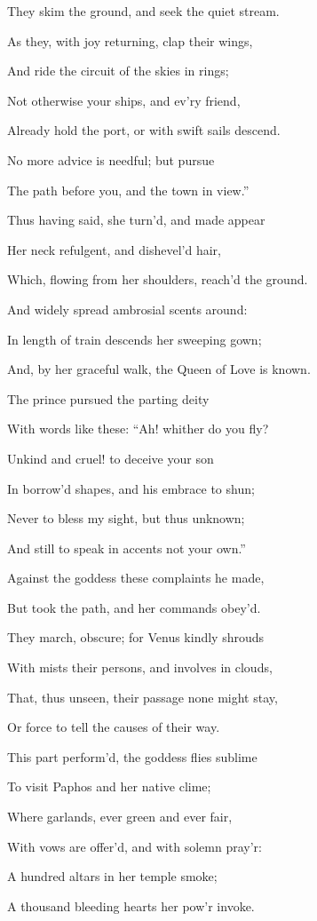 They skim the ground, and seek the quiet stream.

As they, with joy returning, clap their wings,

And ride the circuit of the skies in rings;

Not otherwise your ships, and ev’ry friend,

Already hold the port, or with swift sails descend.

No more advice is needful; but pursue

The path before you, and the town in view.”

Thus having said, she turn’d, and made appear

Her neck refulgent, and dishevel’d hair,

Which, flowing from her shoulders, reach’d the ground.

And widely spread ambrosial scents around:

In length of train descends her sweeping gown;

And, by her graceful walk, the Queen of Love is known.

The prince pursued the parting deity

With words like these: “Ah! whither do you fly?

Unkind and cruel! to deceive your son

In borrow’d shapes, and his embrace to shun;

Never to bless my sight, but thus unknown;

And still to speak in accents not your own.”

Against the goddess these complaints he made,

But took the path, and her commands obey’d.

They march, obscure; for Venus kindly shrouds

With mists their persons, and involves in clouds,

That, thus unseen, their passage none might stay,

Or force to tell the causes of their way.

This part perform’d, the goddess flies sublime

To visit Paphos and her native clime;

Where garlands, ever green and ever fair,

With vows are offer’d, and with solemn pray’r:

A hundred altars in her temple smoke;

A thousand bleeding hearts her pow’r invoke.

